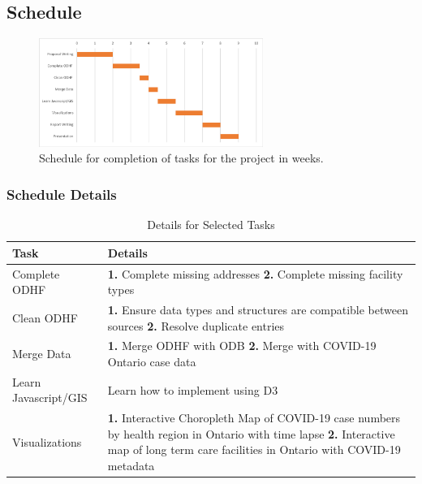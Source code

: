 \documentclass{article}
\begin{document}
\subsection{Schedule}

\begin{figure}[h]
\begin{center}
\includegraphics[width=0.65\textwidth]{schedule} %
\caption{Schedule for completion of tasks for the project in weeks.}
\end{center}
\end{figure}

\subsubsection{Schedule Details}
\begin{table}[h!]
	\begin{center}
   	 \caption{Details for Selected Tasks}
   	 \label{tab:table1}
		\begin{tabular}{l|p{105mm}}
			\textbf{Task} & \textbf{Details} \\
 			\hline\hline
 			Complete ODHF & \textbf{1.} Complete missing addresses \newline \textbf{2.}  Complete missing facility types\\
 			\hline
 			Clean ODHF & \textbf{1.}  Ensure data types and structures are compatible between sources \newline \textbf{2.} Resolve duplicate entries\\
 			\hline
			Merge Data & \textbf{1.} Merge ODHF with ODB \newline \textbf{2.} Merge with COVID-19 Ontario case data\\
			\hline
			Learn Javascript/GIS & Learn how to implement using D3\\
			\hline
			Visualizations & \textbf{1.} Interactive Choropleth Map of COVID-19 case numbers by health region in Ontario with time lapse \newline \textbf{2.} Interactive map of long term care facilities in Ontario with COVID-19 metadata\\

		\end{tabular}

	\end{center}
\end{table}
\end{document}
